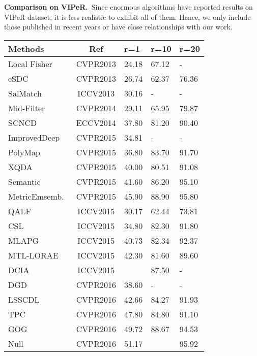 \documentclass[10pt,twocolumn,letterpaper]{article}
\begin{document}
\vspace{1ex}\noindent\textbf{Comparison on VIPeR.}~Since enormous algorithms have reported results on VIPeR dataset, it is less realistic to exhibit all of them. Hence, we only include those published in recent  years or have close relationships with our work.
\begin{table}[tb]
\small
\centering
\begin{tabular}{|lc|*{3}{p{0.65cm}<{\centering}}|}
\hline
Methods        & Ref & r=1 & r=10 & r=20 \\
\hline
\hline
Local Fisher~\cite{local_fisher} & CVPR2013 & 24.18 & 67.12 & - \\
eSDC~\cite{eSDC} & CVPR2013 & 26.74 & 62.37 & 76.36 \\
SalMatch~\cite{SalMatch} & ICCV2013 & 30.16 & - & - \\
Mid-Filter~\cite{Mid-Filter} & CVPR2014 & 29.11 &  65.95 &  79.87 \\
SCNCD~\cite{SCNCD} & ECCV2014  & 37.80 & 81.20 & 90.40 \\
\hline
\hline
ImprovedDeep~\cite{ImprovedDeep} & CVPR2015 & 34.81 & - & - \\
PolyMap~\cite{PolyMap}  & CVPR2015  & 36.80 &	83.70 &	91.70 \\
XQDA~\cite{XQDA} & CVPR2015 & 40.00	& 80.51	& 91.08 \\
Semantic~\cite{Semantic} & CVPR2015 & 41.60 &	86.20 &	95.10\\
MetricEmsemb.~\cite{MetricEmsemble} & CVPR2015 & 45.90 & 88.90 & 95.80 \\
QALF~\cite{zheng2015query} & ICCV2015 & 30.17 & 62.44 & 73.81 \\
CSL~\cite{CSL} & ICCV2015 & 34.80 &	82.30 &	91.80 \\
MLAPG~\cite{MLAPG} & ICCV2015 & 40.73 &	82.34 & 92.37\\
MTL-LORAE~\cite{SuChi1} & ICCV2015 & 42.30 & 81.60 & 89.60 \\
DCIA~\cite{DCIA} & ICCV2015 & \textbf{\color{red}{63.92}} & 87.50 & - \\
\hline
\hline
DGD~\cite{DGD} & CVPR2016 & 38.60 & - & - \\
LSSCDL~\cite{LSSCDL} & CVPR2016 & 42.66 & 84.27 & 91.93 \\
TPC~\cite{TPC} & CVPR2016 & 47.80 & 84.80  & 91.10 \\
GOG~\cite{GOG} & CVPR2016 & 49.72 & 88.67 & 94.53 \\
Null~\cite{null} & CVPR2016 & 51.17	& \textbf{\color{blue}{90.51}}	& 95.92 \\

\end{tabular}
\end{table}
\end{document}

